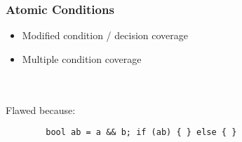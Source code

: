 \begin{frame}[fragile]
    \frametitle{Atomic Conditions}
    \begin{itemize}
        \item Modified condition / decision coverage
        \item Multiple condition coverage
    \end{itemize}
    \\~\\
    Flawed because:
    \begin{verbatim}
        bool ab = a && b; if (ab) { } else { }
    \end{verbatim}
\end{frame}



